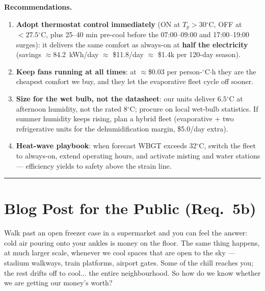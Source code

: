 \documentclass[11pt]{article}
\newcommand{\degrees}{\ensuremath{^\circ}}
\begin{document}
\textbf{Recommendations.}
\begin{enumerate}
\item \textbf{Adopt thermostat control immediately} (ON at $T_p>30\degrees$C, OFF at $<27.5\degrees$C, plus 25--40 min pre-cool before the 07:00--09:00 and 17:00--19:00 surges): it delivers the same comfort as always-on at \textbf{half the electricity} (savings $\approx$84.2~kWh/day $\approx$ \$11.8/day $\approx$ \$1.4k per 120-day season).
\item \textbf{Keep fans running at all times}: at $\approx$\$0.03 per person-$\degrees$C$\cdot$h they are the cheapest comfort we buy, and they let the evaporative fleet cycle off sooner.
\item \textbf{Size for the wet bulb, not the datasheet}: our units deliver $6.5\degrees$C at afternoon humidity, not the rated 8$\degrees$C; procure on local wet-bulb statistics. If summer humidity keeps rising, plan a hybrid fleet (evaporative + two refrigerative units for the dehumidification margin, \$5.0/day extra).
\item \textbf{Heat-wave playbook}: when forecast WBGT exceeds 32$\degrees$C, switch the fleet to always-on, extend operating hours, and activate misting and water stations --- efficiency yields to safety above the strain line.
\end{enumerate}
\vspace{2pt}
\begin{center}\rule{\linewidth}{0.4pt}\end{center}

\section{Blog Post for the Public (Req.\ 5b)}
\begin{center}\end{center}

Walk past an open freezer case in a supermarket and you can feel the answer: cold air pouring onto your ankles is money on the floor. The same thing happens, at much larger scale, whenever we cool spaces that are open to the sky --- stadium walkways, train platforms, airport gates. Some of the chill reaches you; the rest drifts off to cool... the entire neighbourhood. So how do we know whether we are getting our money's worth?
\end{document}
